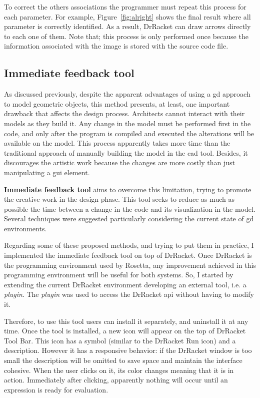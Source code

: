 To correct the others associations the programmer must repeat this process for each parameter. For example, Figure~\ref{fig:alright} shows the final result where all parameter is correctly identified. As a result, DrRacket can draw arrows directly to each one of them. Note that; this process is only performed once because the information associated with the image is stored with the source code file.

\subsection{Immediate feedback tool}

As discussed previously, despite the apparent advantages of using a \gls{gd} approach to model geometric objects, this method presents, at least, one important drawback that affects the design process. Architects cannot interact with their models as they build it. Any change in the model must be performed first in the code, and only after the program is compiled and executed the alterations will be available on the model. This process apparently takes more time than the traditional approach of manually building the model in the \gls{cad} tool. Besides, it discourages the artistic work because the changes are more costly than just manipulating a \gls{gui} element.

\textbf{Immediate feedback tool} aims to overcome this limitation, trying to promote the creative work in the design phase. This tool seeks to reduce as much as possible the time between a change in the code and its visualization in the model. Several techniques were suggested particularly considering the current state of \gls{gd} environments.

Regarding some of these proposed methods, and trying to put them in practice, I implemented the immediate feedback tool on top of DrRacket. Once DrRacket is the programming environment used by Rosetta, any improvement achieved in this programming environment will be useful for both systems. So, I started by extending the current DrRacket environment developing an external tool, i.e. a \textit{\textit{plugin}}. The \textit{\textit{plugin}} was used to access the DrRacket \gls{api} without having to modify it.

Therefore, to use this tool users can install it separately, and uninstall it at any time. Once the tool is installed, a new icon will appear on the top of DrRacket Tool Bar. This icon has a symbol (similar to the DrRacket Run icon) and a description. However it has a responsive behavior: if the DrRacket window is too small the description will be omitted to save space and maintain the interface cohesive. When the user clicks on it, its color changes meaning that it is in action. Immediately after clicking, apparently nothing will occur until an expression is ready for evaluation.

